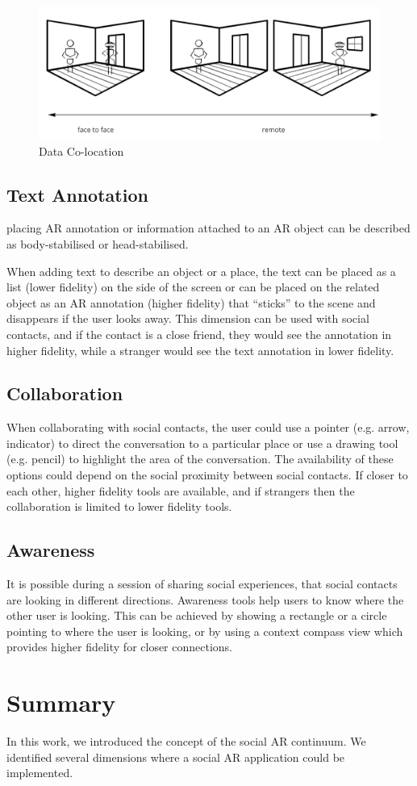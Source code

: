 \begin{figure}[h]
    \centering
    \includegraphics[width=.8\linewidth]{images/continuum-colocation.jpg}
    \caption{Data Co-location}
    \label{fig:continuum:data-colocation}
\end{figure}


\subsection{Text Annotation}

placing AR annotation or information attached to an AR object can be described as body-stabilised or head-stabilised.

When adding text to describe an object or a place, the text can be placed as a list (lower fidelity) on the side of the screen or can be placed on the related object as an AR annotation (higher fidelity) that ``sticks'' to the scene and disappears if the user looks away. This dimension can be used with social contacts, and if the contact is a close friend, they would see the annotation in higher fidelity, while a stranger would see the text annotation in lower fidelity. 

\subsection{Collaboration}

When collaborating with social contacts, the user could use a pointer (e.g. arrow, indicator) to direct the conversation to a particular place or use a drawing tool (e.g. pencil) to highlight the area of the conversation. The availability of these options could depend on the social proximity between social contacts. If closer to each other, higher fidelity tools are available, and if strangers then the collaboration is limited to lower fidelity tools.

\subsection{Awareness}

It is possible during a session of sharing social experiences, that social contacts are looking in different directions. Awareness tools help users to know where the other user is looking. This can be achieved by showing a rectangle or a circle pointing to where the user is looking, or by using a context compass view which provides higher fidelity for closer connections.

\section{Summary}

In this work, we introduced the concept of the social AR continuum. We identified several dimensions where a social AR application could be implemented.
